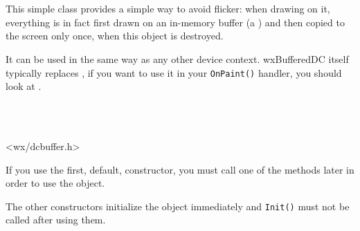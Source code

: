 
\section{}\label{wxbuffereddc}

This simple class provides a simple way to avoid flicker: when drawing on it,
everything is in fact first drawn on an in-memory buffer (a 
) and then copied to the screen only once, when this
object is destroyed.

It can be used in the same way as any other device context. wxBufferedDC itself
typically replaces , if you want to use it in
your \texttt{OnPaint()} handler, you should look at
.


\\
\\


<wx/dcbuffer.h>





\label{wxbuffereddcctor}




If you use the first, default, constructor, you must call one of the 
 methods later in order to use the object.

The other constructors initialize the object immediately and \texttt{Init()} 
must not be called after using them.

